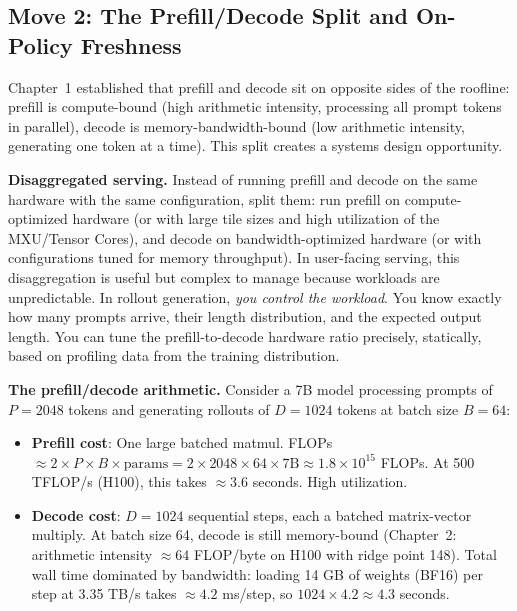 \subsection*{Move 2: The Prefill/Decode Split and On-Policy Freshness}

Chapter~1 established that prefill and decode sit on opposite sides of the roofline: prefill is compute-bound (high arithmetic intensity, processing all prompt tokens in parallel), decode is memory-bandwidth-bound (low arithmetic intensity, generating one token at a time). This split creates a systems design opportunity.

\textbf{Disaggregated serving.} Instead of running prefill and decode on the same hardware with the same configuration, split them: run prefill on compute-optimized hardware (or with large tile sizes and high utilization of the MXU/Tensor Cores), and decode on bandwidth-optimized hardware (or with configurations tuned for memory throughput). In user-facing serving, this disaggregation is useful but complex to manage because workloads are unpredictable. In rollout generation, \textit{you control the workload}. You know exactly how many prompts arrive, their length distribution, and the expected output length. You can tune the prefill-to-decode hardware ratio precisely, statically, based on profiling data from the training distribution.

\textbf{The prefill/decode arithmetic.} Consider a 7B model processing prompts of $P = 2048$ tokens and generating rollouts of $D = 1024$ tokens at batch size $B = 64$:

\begin{itemize}
  \item \textbf{Prefill cost}: One large batched matmul. FLOPs $\approx 2 \times P \times B \times \text{params} = 2 \times 2048 \times 64 \times 7\text{B} \approx 1.8 \times 10^{15}$ FLOPs. At 500 TFLOP/s (H100), this takes $\approx 3.6$ seconds. High utilization.
  \item \textbf{Decode cost}: $D = 1024$ sequential steps, each a batched matrix-vector multiply. At batch size 64, decode is still memory-bound (Chapter~2: arithmetic intensity $\approx 64$ FLOP/byte on H100 with ridge point 148). Total wall time dominated by bandwidth: loading 14 GB of weights (BF16) per step at 3.35 TB/s takes $\approx 4.2$ ms/step, so $1024 \times 4.2 \approx 4.3$ seconds.
\end{itemize}

